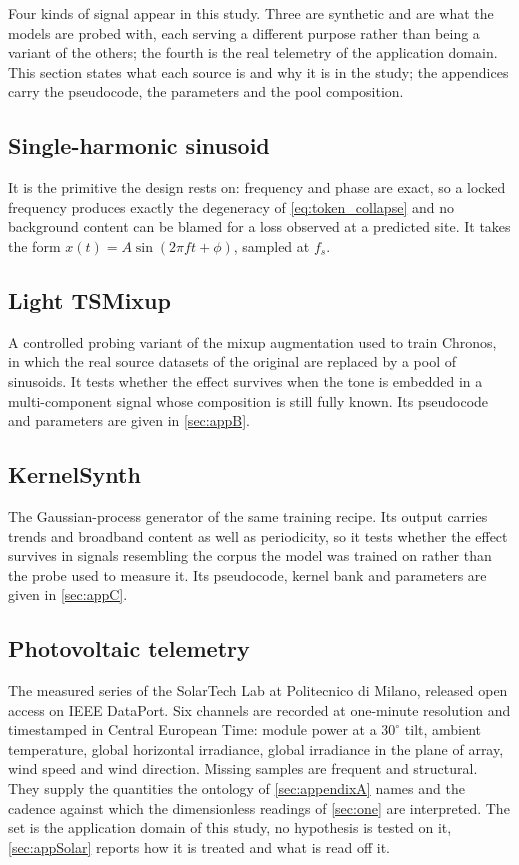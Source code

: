Four kinds of signal appear in this study. Three are synthetic and are what the models are probed with, each serving a different purpose rather than being a variant of the others; the fourth is the real telemetry of the application domain. This section states what each source is and why it is in the study; the appendices carry the pseudocode, the parameters and the pool composition.

\subsection*{Single-harmonic sinusoid}

It is the primitive the design rests on: frequency and phase are exact, so a locked frequency produces exactly the degeneracy of \autoref{eq:token_collapse} and no background content can be blamed for a loss observed at a predicted site. It takes the form $x(t)=A\sin(2\pi f t+\phi)$, sampled at $f_s$.

\subsection*{Light TSMixup}

A controlled probing variant of the mixup augmentation used to train Chronos\autocite{ansariChronosLearningLanguage2024}, in which the real source datasets of the original are replaced by a pool of sinusoids. It tests whether the effect survives when the tone is embedded in a multi-component signal whose composition is still fully known. Its pseudocode and parameters are given in \autoref{sec:appB}.

\subsection*{KernelSynth}

The Gaussian-process generator of the same training recipe\autocite{ansariChronosLearningLanguage2024}. Its output carries trends and broadband content as well as periodicity, so it tests whether the effect survives in signals resembling the corpus the model was trained on rather than the probe used to measure it. Its pseudocode, kernel bank and parameters are given in \autoref{sec:appC}.

\subsection*{Photovoltaic telemetry}

The measured series of the SolarTech Lab at Politecnico di Milano, released open access on IEEE DataPort\autocite{levaPhotovoltaicPowerWeather2020}. Six channels are recorded at one-minute resolution and timestamped in Central European Time: module power at a $30^\circ$ tilt, ambient temperature, global horizontal irradiance, global irradiance in the plane of array, wind speed and wind direction. Missing samples are frequent and structural. They supply the quantities the ontology of \autoref{sec:appendixA} names and the cadence against which the dimensionless readings of \autoref{sec:one} are interpreted. The set is the application domain of this study, no hypothesis is tested on it, \autoref{sec:appSolar} reports how it is treated and what is read off it.